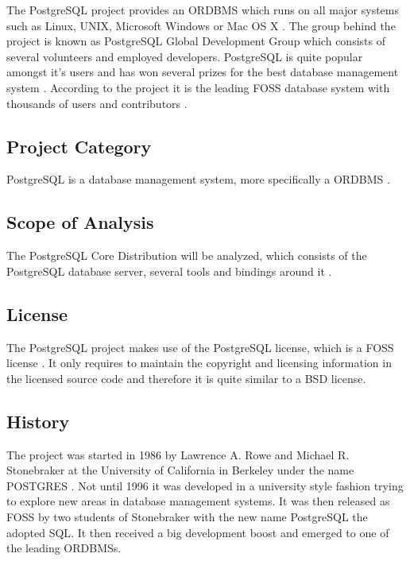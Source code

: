 The PostgreSQL project provides an \ac{ORDBMS} which runs on all major systems
such as Linux, UNIX, Microsoft Windows or Mac OS X
\cite{PostgreSQLAbout,PostgreSQLFAQ}. The group behind the project is known as
PostgreSQL Global Development Group which consists of several volunteers and
employed developers. PostgreSQL is quite popular amongst it's users and has won
several prizes for the best database management system \cite{PostgreSQLAwards}.
According to the project it is the leading \ac{FOSS} database system with
thousands of users and contributors \cite{PostgreSQLPressKit}.

\subsection{Project Category}

PostgreSQL is a database management system, more specifically a \ac{ORDBMS}
\cite{PostgreSQLAbout}.

\subsection{Scope of Analysis}

The PostgreSQL Core Distribution will be analyzed, which consists of the
PostgreSQL database server, several tools and bindings around it
\cite{PostgreSQLDownload}.

\subsection{License}

The PostgreSQL project makes use of the PostgreSQL license, which is a
\ac{FOSS} license \cite{PostgreSQLFAQ,PostgreSQLLicense}. It only requires to
maintain the copyright and licensing information in the licensed source code
and therefore it is quite similar to a BSD license.

\subsection{History}

The project was started in 1986 by Lawrence A. Rowe and Michael R. Stonebraker
at the University of California in Berkeley under the name POSTGRES
\cite{PostgreSQLHistory}. Not until 1996 it was developed in a university style
fashion trying to explore new areas in database management systems. It was then
released as \ac{FOSS} by two students of Stonebraker with the new name
PostgreSQL the adopted \ac{SQL}. It then received a big development boost and
emerged to one of the leading \acp{ORDBMS}.

